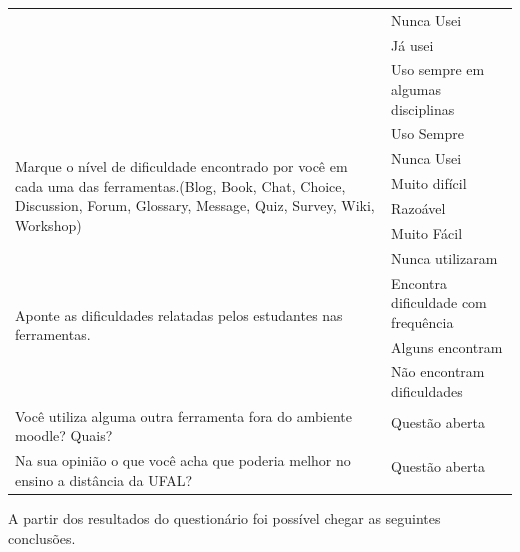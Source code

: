 \documentclass[12pt]{article}
\begin{document}
\begin{table}[!htpb]
\begin{tabular}{|l|l|}
& Nunca Usei\\
& Já usei \\
& Uso sempre em algumas disciplinas \\
& Uso Sempre \\ \hline
\multirow{4}{9cm}{Marque o nível de dificuldade encontrado por você em cada uma das ferramentas.(Blog, Book, Chat, Choice, Discussion, Forum, Glossary, Message, Quiz, Survey, Wiki, Workshop)}
& Nunca Usei\\
& Muito difícil \\
& Razoável\\
& Muito Fácil \\ \hline
\multirow{4}{9cm}{Aponte as dificuldades relatadas pelos estudantes nas ferramentas.}
& Nunca utilizaram\\
& Encontra dificuldade com frequência \\
& Alguns encontram \\
& Não encontram dificuldades \\ \hline
\multirow{2}{9cm}{Você utiliza alguma outra ferramenta fora do ambiente moodle? Quais?}
& Questão aberta \\
&  \\ \hline
\multirow{2}{9cm}{Na sua opinião o que você acha que poderia melhor no ensino a distância da UFAL?}
& Questão aberta\\
& \\ \hline	
\end{tabular}
\label{t_fixa}
\end{table}
A partir dos resultados do questionário foi possível chegar as seguintes conclusões. 
\end{document}
